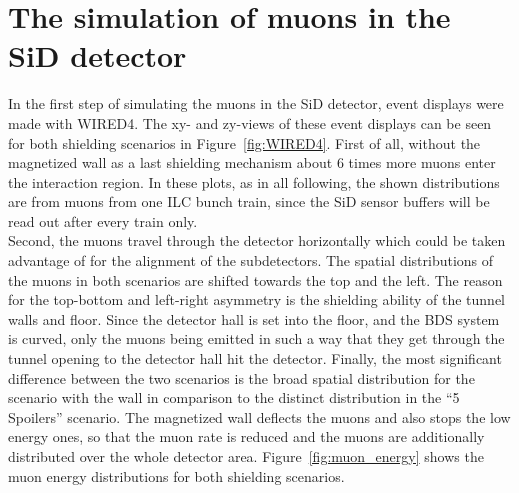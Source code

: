 \section{The simulation of muons in the SiD detector}
\label{Detector}

In the first step of simulating the muons in the SiD detector, event displays were made with WIRED4\cite{Wired4}.
The xy- and zy-views of these event displays can be seen for both shielding scenarios in Figure~\ref{fig:WIRED4}.
First of all, without the magnetized wall as a last shielding mechanism about 6 times more muons enter the interaction region.
In these plots, as in all following, the shown distributions are from muons from one ILC bunch train, since the SiD sensor buffers will be read out after every train only.\\
Second, the muons travel through the detector horizontally which could be taken advantage of for the alignment of the subdetectors.
The spatial distributions of the muons in both scenarios are shifted towards the top and the left.
The reason for the top-bottom and left-right asymmetry is the shielding ability of the tunnel walls and floor.
Since the detector hall is set into the floor, and the BDS system is curved, only the muons being emitted in such a way that they get through the tunnel opening to the detector hall hit the detector.
Finally, the most significant difference between the two scenarios is the broad spatial distribution for the scenario with the wall in comparison to the distinct distribution in the ``5 Spoilers'' scenario.
The magnetized wall deflects the muons and also stops the low energy ones, so that the muon rate is reduced and the muons are additionally distributed over the whole detector area.
Figure~\ref{fig:muon_energy} shows the muon energy distributions for both shielding scenarios.

